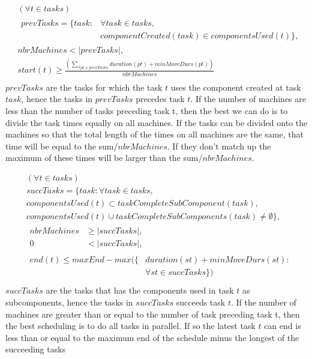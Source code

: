  \begin{equation}
 \begin{aligned}\label{eq:71}
 &(\forall t \in tasks) \\
 &\begin{aligned}
 prevTasks = \{task : &\forall task \in tasks,\\
 &componentCreated(task) \in componentsUsed(t)\},
 \end{aligned} \\
 &nbrMachines < |prevTasks|,  \\
 &start(t) \ge \frac{\left(\sum_{\forall pt \in prevTasks}duration(pt) + minMoveDurs(pt)\right)}{nbrMachines} \\
 \end{aligned}
 \end{equation}
 $prevTasks$ are the tasks for which the task $t$ uses the component created at task $task$, hence the tasks in $prevTasks$ precedes task $t$. If the number of machines are less than the number of tasks preceding task t, then the best we can do is to divide the task times equally on all machines. If the tasks can be divided onto the machines so that the total length of the times on all machines are the same, that time will be equal to the sum$/nbrMachines$. If they don't match up the maximum of these times will be larger than the sum$/nbrMachines$.
 
 \begin{equation}\label{eq:72}
 \begin{aligned}
 &(\forall t \in tasks) \\
 &succTasks = \{task : \forall task \in tasks,\\
 &componentsUsed(t) \subset taskCompleteSubComponent(task), \\
 &componentsUsed(t) \cup taskCompleteSubComponents(task) \neq \emptyset\}, \\
 &\begin{aligned}
 nbrMachines &\ge |succTasks|,\\
 0 &< |succTasks|,
 \end{aligned}\\
 &\begin{aligned}
 end(t) \le maxEnd - max(\{&duration(st) + minMoveDurs(st) :\\
 &\forall st \in succTasks\})
 \end{aligned}\\
 \end{aligned}
 \end{equation}
 $succTasks$ are the tasks that has the components used in task $t$ as subcomponents, hence the tasks in $succTasks$ succeeds task $t$. If the number of machines are greater than or equal to the number of task preceding task t, then the best scheduling is to do all tasks in parallel. If so the latest task $t$ can end is less than or equal to the maximum end of the schedule minus the longest of the succeeding tasks
 
